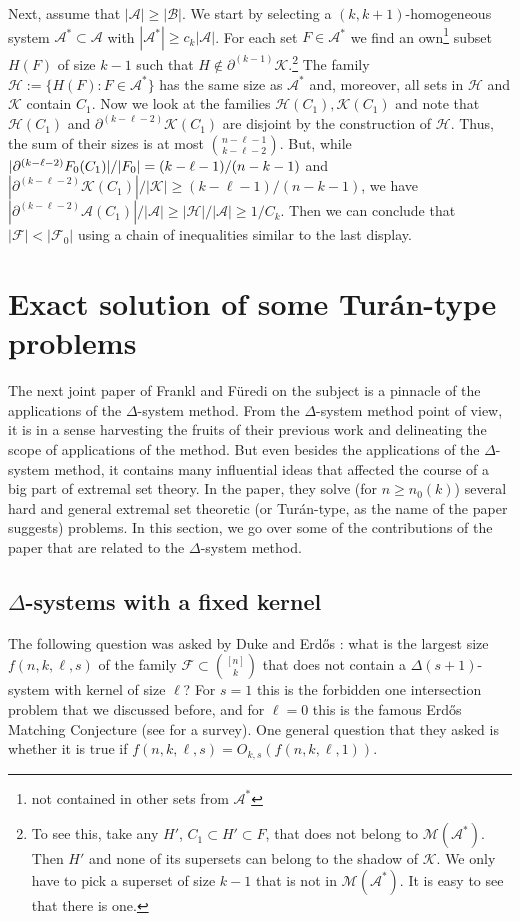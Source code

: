 \documentclass[graybox]{svmult}
\renewcommand{\ge}{\geqslant}
\newcommand{\ff}{\mathcal{F}}
\newcommand{\m}{\mathcal}
\begin{document}
Next, assume that $|\m A|\ge |\m B|$. We start by selecting a $(k,k+1)$-homogeneous system $\m A^*\subset \m A$ with $|\m A^*|\ge c_k|\m A|$. For each set  $F\in \m A^*$ we find an own\footnote{not contained in other sets from $\m A^*$} subset $H(F)$ of size $k-1$ such that $H\notin \partial^{(k-1)}\m K$.\footnote{To see this, take any $H'$, $C_1\subset H'\subset F$, that does not belong to $\m M(\m A^*)$. Then $H'$ and none of its supersets can belong to the shadow of $\m K$. We only have to pick a superset of size $k-1$ that is not in $\m M(\m A^*)$. It is easy to see that there is one.}   The family $\m H:=\{H(F):F\in \m A^*\}$ has the same size as $\m A^*$ and, moreover, all sets in $\m H$ and $\m K$ contain $C_1$. Now we look at the families $\m H(C_1), \m K(C_1)$ and note that $\m H(C_1)$ and $\partial^{(k-\ell-2)}\m K(C_1)$ are disjoint by the construction of $\m H$. Thus, the sum of their sizes is at most ${n-\ell-1\choose k-\ell-2}$. But, while $|\partial^{(k-\ell-2)}\m \ff_0(C_1)|/|\m \ff_0| = (k-\ell-1)/(n-k-1)$ and $|\partial^{(k-\ell-2)}\m K(C_1)|/|\m K| \ge (k-\ell-1)/(n-k-1)$, we have
$|\partial^{(k-\ell-2)}\m A(C_1)|/|\m A|\ge |\m H|/|\m A| \ge 1/C_k$. Then we can conclude that $|\ff|<|\ff_0|$ using a chain of inequalities similar to the last display.


\section{Exact solution of some Tur\'an-type problems}\label{sec4}
The next joint paper of Frankl and F\"uredi \cite{FF2} on the subject is a pinnacle of the applications of the $\Delta$-system method. From the $\Delta$-system method point of view, it is in a sense harvesting the fruits of their previous work \cite{FF1} and delineating the scope of applications of the method. But even besides the applications of the $\Delta$-system method, it contains many influential ideas that affected the course of a big part of extremal set theory. In the paper, they solve (for $n\ge n_0(k)$) several hard and general extremal set theoretic (or Tur\'an-type, as the name of the paper suggests) problems. In this section, we go over some of the contributions of the paper that are related to the $\Delta$-system method.

\subsection{$\Delta$-systems with a fixed kernel}\label{sec41} The following question was asked by Duke and Erd\H os \cite{DE}: what is the largest size $f(n,k,\ell, s)$ of the family $\ff\subset {[n]\choose k}$ that does not contain a $\Delta(s+1)$-system with kernel of size $\ell$? For $s=1$ this is the forbidden one intersection problem that we discussed before, and for $\ell=0$ this is the famous Erd\H os Matching Conjecture \cite{E} (see \cite{FK21} for a survey). One general question that they asked is whether it is true if $f(n,k,\ell,s)=O_{k,s} (f(n,k,\ell,1))$.
\end{document}
